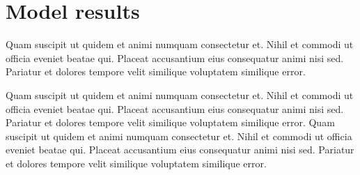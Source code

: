 \documentclass[fleqn,10pt]{physiome}
\begin{document}
\section{Model results}
Quam suscipit ut quidem et animi numquam consectetur et. Nihil et commodi ut officia eveniet beatae qui. Placeat accusantium eius consequatur animi nisi sed. Pariatur et dolores tempore velit similique voluptatem similique error.

Quam suscipit ut quidem et animi numquam consectetur et. Nihil et commodi ut officia eveniet beatae qui. Placeat accusantium eius consequatur animi nisi sed. Pariatur et dolores tempore velit similique voluptatem similique error. Quam suscipit ut quidem et animi numquam consectetur et. Nihil et commodi ut officia eveniet beatae qui. Placeat accusantium eius consequatur animi nisi sed. Pariatur et dolores tempore velit similique voluptatem similique error.





\end{document}
